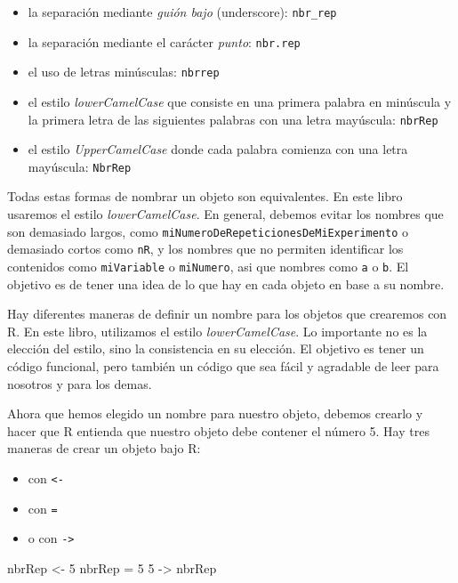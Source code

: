 \documentclass[]{book}
\makeatletter
\newenvironment{Shaded}{\begin{snugshade}}{\end{snugshade}}
\newcommand{\DecValTok}[1]{\textcolor[rgb]{0.00,0.00,0.81}{#1}}
\newcommand{\StringTok}[1]{\textcolor[rgb]{0.31,0.60,0.02}{#1}}
\newcommand{\NormalTok}[1]{#1}
\providecommand{\tightlist}{%
  \setlength{\itemsep}{0pt}\setlength{\parskip}{0pt}}
\newenvironment{kframe}{%
\medskip{}
\setlength{\fboxsep}{.8em}
 \def\at@end@of@kframe{}%
 \ifinner\ifhmode%
  \def\at@end@of@kframe{\end{minipage}}%
  \begin{minipage}{\columnwidth}%
 \fi\fi%
 \def\FrameCommand##1{\hskip\@totalleftmargin \hskip-\fboxsep
 \colorbox{shadecolor}{##1}\hskip-\fboxsep
     \hskip-\linewidth \hskip-\@totalleftmargin \hskip\columnwidth}%
 \MakeFramed {\advance\hsize-\width
   \@totalleftmargin\z@ \linewidth\hsize
   \@setminipage}}%
 {\par\unskip\endMakeFramed%
 \at@end@of@kframe}
\newenvironment{rmdblock}[1]
  {
  \begin{itemize}
  \renewcommand{\labelitemi}{
    \raisebox{-.7\height}[0pt][0pt]{
      {\setkeys{Gin}{width=3em,keepaspectratio}\texttt{[image: myIcons/\#1]}} %
    }
  }
  \setlength{\fboxsep}{1em}
  \begin{kframe}
  \item
  }
  {
  \end{kframe}
  \end{itemize}
  }
\newenvironment{rmdstyle}     %
  {\begin{rmdblock}{style}}   %
  {\end{rmdblock}}            %
\makeatother
\begin{document}
\begin{itemize}
\tightlist
\item
  la separación mediante \emph{guión bajo} (underscore):
  \texttt{nbr\_rep}
\item
  la separación mediante el carácter \emph{punto}: \texttt{nbr.rep}
\item
  el uso de letras minúsculas: \texttt{nbrrep}
\item
  el estilo \emph{lowerCamelCase} que consiste en una primera palabra en
  minúscula y la primera letra de las siguientes palabras con una letra
  mayúscula: \texttt{nbrRep}
\item
  el estilo \emph{UpperCamelCase} donde cada palabra comienza con una
  letra mayúscula: \texttt{NbrRep}
\end{itemize}

Todas estas formas de nombrar un objeto son equivalentes. En este libro
usaremos el estilo \emph{lowerCamelCase}. En general, debemos evitar los
nombres que son demasiado largos, como
\texttt{miNumeroDeRepeticionesDeMiExperimento} o demasiado cortos como
\texttt{nR}, y los nombres que no permiten identificar los contenidos
como \texttt{miVariable} o \texttt{miNumero}, asi que nombres como
\texttt{a} o \texttt{b}. El objetivo es de tener una idea de lo que hay
en cada objeto en base a su nombre.

\begin{rmdstyle}
Hay diferentes maneras de definir un nombre para los objetos que
crearemos con R. En este libro, utilizamos el estilo
\emph{lowerCamelCase}. Lo importante no es la elección del estilo, sino
la consistencia en su elección. El objetivo es tener un código
funcional, pero también un código que sea fácil y agradable de leer para
nosotros y para los demas.
\end{rmdstyle}

Ahora que hemos elegido un nombre para nuestro objeto, debemos crearlo y
hacer que R entienda que nuestro objeto debe contener el número 5. Hay
tres maneras de crear un objeto bajo R:

\begin{itemize}
\tightlist
\item
  con \texttt{\textless{}-}
\item
  con \texttt{=}
\item
  o con \texttt{-\textgreater{}}
\end{itemize}

\begin{Shaded}
\begin{Highlighting}[]
\NormalTok{nbrRep <-}\StringTok{ }\DecValTok{5}
\NormalTok{nbrRep =}\StringTok{ }\DecValTok{5}
\DecValTok{5}\NormalTok{ ->}\StringTok{ }\NormalTok{nbrRep}
\end{Highlighting}
\end{Shaded}
\end{document}
